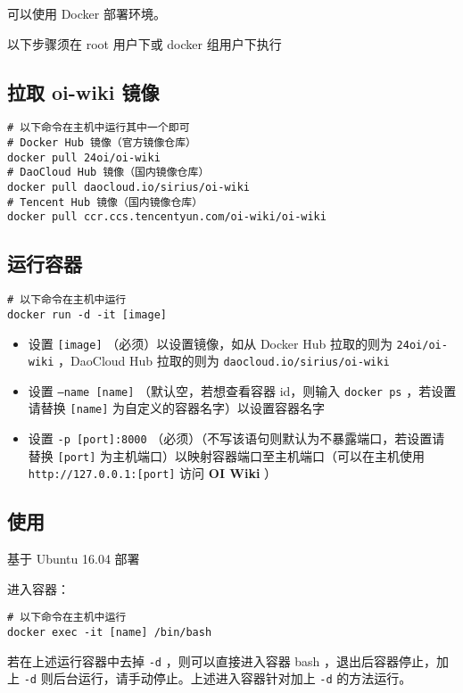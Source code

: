 
可以使用 Docker 部署环境。

以下步骤须在 root 用户下或 docker 组用户下执行

\subsection{拉取 oi-wiki 镜像}

\begin{verbatim}
# 以下命令在主机中运行其中一个即可
# Docker Hub 镜像（官方镜像仓库）
docker pull 24oi/oi-wiki
# DaoCloud Hub 镜像（国内镜像仓库）
docker pull daocloud.io/sirius/oi-wiki
# Tencent Hub 镜像（国内镜像仓库）
docker pull ccr.ccs.tencentyun.com/oi-wiki/oi-wiki
\end{verbatim}

\subsection{运行容器}

\begin{verbatim}
# 以下命令在主机中运行
docker run -d -it [image]
\end{verbatim}

\begin{itemize}
\item 设置 \texttt{[image]} （必须）以设置镜像，如从 Docker Hub 拉取的则为 \texttt{24oi/oi-wiki} ，DaoCloud Hub 拉取的则为 \texttt{daocloud.io/sirius/oi-wiki}
\item 设置 \texttt{--name [name]} （默认空，若想查看容器 id，则输入 \texttt{docker ps} ，若设置请替换 \texttt{[name]} 为自定义的容器名字）以设置容器名字
\item 设置 \texttt{-p [port]:8000} （必须）（不写该语句则默认为不暴露端口，若设置请替换 \texttt{[port]} 为主机端口）以映射容器端口至主机端口（可以在主机使用 \texttt{http://127.0.0.1:[port]} 访问 \textbf{OI Wiki} ）
\end{itemize}

\subsection{使用}

基于 Ubuntu 16.04 部署

进入容器：

\begin{verbatim}
# 以下命令在主机中运行
docker exec -it [name] /bin/bash
\end{verbatim}

若在上述运行容器中去掉 \texttt{-d} ，则可以直接进入容器 bash ，退出后容器停止，加上 \texttt{-d} 则后台运行，请手动停止。上述进入容器针对加上 \texttt{-d} 的方法运行。

